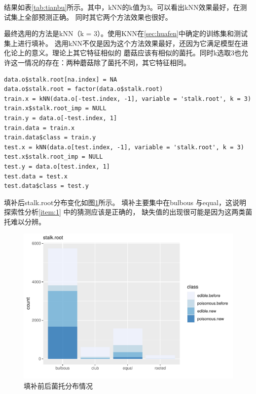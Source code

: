 \documentclass[lang=cn,11pt,a4paper,cite=super]{elegantpaper}
\begin{document}
\par 结果如表\ref{tab:tianbu}所示。其中，kNN的k值为3。可以看出kNN效果最好，在测试集上全部预测正确。
同时其它两个方法效果也很好。
\begin{table}[!htbp]
   \centering
   \caption{3种方法的填补准确率}
   \label{tab:tianbu}
\end{table}
最终选用的方法是kNN（k = 3）。使用KNN在\ref{sec:huafen}中确定的训练集和测试集上进行填补。
选用kNN不仅是因为这个方法效果最好，还因为它满足模型在进化论上的意义。理论上其它特征相似的
蘑菇应该有相似的菌托。同时k选取3也允许这一情况的存在：两种蘑菇除了菌托不同，其它特征相同。
\begin{lstlisting}[style=R]
data.o$stalk.root[na.index] = NA
data.o$stalk.root = factor(data.o$stalk.root)
train.x = kNN(data.o[-test.index, -1], variable = 'stalk.root', k = 3)
train.x$stalk.root_imp = NULL
train.y = data.o[-test.index, 1]
train.data = train.x
train.data$class = train.y
test.x = kNN(data.o[test.index, -1], variable = 'stalk.root', k = 3)
test.x$stalk.root_imp = NULL
test.y = data.o[test.index, 1]
test.data = test.x
test.data$class = test.y
\end{lstlisting}
\par 填补后stalk.root分布变化如图\ref{fig:afterimp}所示。
填补主要集中在bulbous 与equal，这说明探索性分析\ref{item:1} 中的猜测应该是正确的，
缺失值的出现很可能是因为这两类菌托难以分辨。
\begin{figure}[htb]
   \centering
   \includegraphics[width=0.8\linewidth]{img/afterimp-1.pdf}
   \caption{填补前后菌托分布情况}
   \label{fig:afterimp}
\end{figure}
\end{document}
